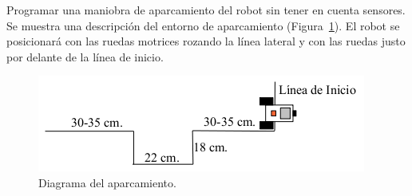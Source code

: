 \par Programar una maniobra de aparcamiento del robot sin tener en cuenta sensores. Se muestra una descripción del entorno de aparcamiento (Figura~\ref{aparcamiento}). El robot se posicionará con las ruedas motrices rozando la línea lateral y con las ruedas justo por delante de la línea de inicio.

\begin{figure}[ht!]
 \centering
 \includegraphics[scale=0.7]{./img/recorrido1.png}
 \caption{Diagrama del aparcamiento.}
 \label{aparcamiento}
\end{figure}

